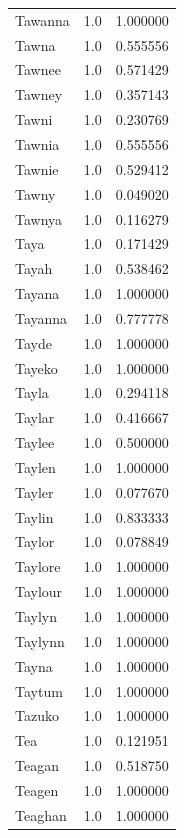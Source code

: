 \documentclass[
  letterpaper,
  DIV=11,
  numbers=noendperiod]{scrreprt}
\begin{document}
\begin{tabular}{lrr}
Tawanna         &   1.0 &   1.000000 \\
Tawna           &   1.0 &   0.555556 \\
Tawnee          &   1.0 &   0.571429 \\
Tawney          &   1.0 &   0.357143 \\
Tawni           &   1.0 &   0.230769 \\
Tawnia          &   1.0 &   0.555556 \\
Tawnie          &   1.0 &   0.529412 \\
Tawny           &   1.0 &   0.049020 \\
Tawnya          &   1.0 &   0.116279 \\
Taya            &   1.0 &   0.171429 \\
Tayah           &   1.0 &   0.538462 \\
Tayana          &   1.0 &   1.000000 \\
Tayanna         &   1.0 &   0.777778 \\
Tayde           &   1.0 &   1.000000 \\
Tayeko          &   1.0 &   1.000000 \\
Tayla           &   1.0 &   0.294118 \\
Taylar          &   1.0 &   0.416667 \\
Taylee          &   1.0 &   0.500000 \\
Taylen          &   1.0 &   1.000000 \\
Tayler          &   1.0 &   0.077670 \\
Taylin          &   1.0 &   0.833333 \\
Taylor          &   1.0 &   0.078849 \\
Taylore         &   1.0 &   1.000000 \\
Taylour         &   1.0 &   1.000000 \\
Taylyn          &   1.0 &   1.000000 \\
Taylynn         &   1.0 &   1.000000 \\
Tayna           &   1.0 &   1.000000 \\
Taytum          &   1.0 &   1.000000 \\
Tazuko          &   1.0 &   1.000000 \\
Tea             &   1.0 &   0.121951 \\
Teagan          &   1.0 &   0.518750 \\
Teagen          &   1.0 &   1.000000 \\
Teaghan         &   1.0 &   1.000000 \\

\end{tabular}
\end{document}
